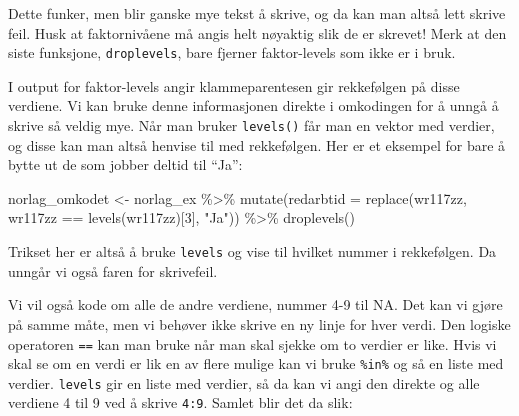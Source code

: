 \documentclass[
  letterpaper,
  DIV=11,
  numbers=noendperiod]{scrreprt}
\newenvironment{Shaded}{\begin{snugshade}}{\end{snugshade}}
\newcommand{\AttributeTok}[1]{\textcolor[rgb]{0.40,0.45,0.13}{#1}}
\newcommand{\ConstantTok}[1]{\textcolor[rgb]{0.56,0.35,0.01}{#1}}
\newcommand{\DecValTok}[1]{\textcolor[rgb]{0.68,0.00,0.00}{#1}}
\newcommand{\FunctionTok}[1]{\textcolor[rgb]{0.28,0.35,0.67}{#1}}
\newcommand{\NormalTok}[1]{\textcolor[rgb]{0.00,0.23,0.31}{#1}}
\newcommand{\OtherTok}[1]{\textcolor[rgb]{0.00,0.23,0.31}{#1}}
\newcommand{\SpecialCharTok}[1]{\textcolor[rgb]{0.37,0.37,0.37}{#1}}
\newcommand{\StringTok}[1]{\textcolor[rgb]{0.13,0.47,0.30}{#1}}
\theoremstyle{definition}
\theoremstyle{remark}
\begin{document}
Dette funker, men blir ganske mye tekst å skrive, og da kan man altså
lett skrive feil. Husk at faktornivåene må angis helt nøyaktig slik de
er skrevet! Merk at den siste funksjone, \texttt{droplevels}, bare
fjerner faktor-levels som ikke er i bruk.

I output for faktor-levels angir klammeparentesen gir rekkefølgen på
disse verdiene. Vi kan bruke denne informasjonen direkte i omkodingen
for å unngå å skrive så veldig mye. Når man bruker \texttt{levels()} får
man en vektor med verdier, og disse kan man altså henvise til med
rekkefølgen. Her er et eksempel for bare å bytte ut de som jobber deltid
til ``Ja'':

\begin{Shaded}
\begin{Highlighting}[]
\NormalTok{norlag\_omkodet }\OtherTok{\textless{}{-}}\NormalTok{ norlag\_ex }\SpecialCharTok{\%\textgreater{}\%}
  \FunctionTok{mutate}\NormalTok{(}\AttributeTok{redarbtid =} \FunctionTok{replace}\NormalTok{(wr117zz, wr117zz }\SpecialCharTok{==} \FunctionTok{levels}\NormalTok{(wr117zz)[}\DecValTok{3}\NormalTok{], }\StringTok{"Ja"}\NormalTok{)) }\SpecialCharTok{\%\textgreater{}\%} 
  \FunctionTok{droplevels}\NormalTok{()}
\end{Highlighting}
\end{Shaded}

Trikset her er altså å bruke \texttt{levels} og vise til hvilket nummer
i rekkefølgen. Da unngår vi også faren for skrivefeil.

Vi vil også kode om alle de andre verdiene, nummer 4-9 til NA. Det kan
vi gjøre på samme måte, men vi behøver ikke skrive en ny linje for hver
verdi. Den logiske operatoren \texttt{==} kan man bruke når man skal
sjekke om to verdier er like. Hvis vi skal se om en verdi er lik en av
flere mulige kan vi bruke \texttt{\%in\%} og så en liste med verdier.
\texttt{levels} gir en liste med verdier, så da kan vi angi den direkte
og alle verdiene 4 til 9 ved å skrive \texttt{4:9}. Samlet blir det da
slik:

\begin{Shaded}
\end{Shaded}
\end{document}
